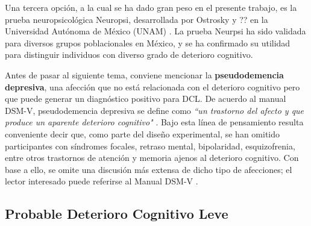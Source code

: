 Una tercera opción, a la cual se ha dado gran peso en el presente trabajo, es la prueba neuropsicológica Neuropsi, desarrollada por Ostrosky y ?? en la Universidad Autónoma de México (UNAM) \cite{Ostrosky1999}.
%
La prueba Neurpsi ha sido validada para diversos grupos poblacionales en México, y se ha confirmado su utilidad para distinguir individuos con diverso grado de deterioro cognitivo.


Antes de pasar al siguiente tema, conviene mencionar la \textbf{pseudodemencia depresiva}, una afección que no está relacionada con el deterioro cognitivo pero que puede generar un diagnóstico positivo para DCL.
%
De acuerdo al manual DSM-V, pseudodemencia depresiva se define como \textit{``un trastorno del afecto y que produce un aparente deterioro cognitivo"} \cite{DCM5}.
%
Bajo esta línea de pensamiento resulta conveniente decir que, como parte del diseño experimental, se han omitido participantes con síndromes focales, retraso mental, bipolaridad, esquizofrenia, entre otros trastornos de atención y memoria ajenos al deterioro cognitivo. 
%
Con base a ello, se omite una discusión más extensa de dicho tipo de afecciones; el lector interesado puede referirse al Manual DSM-V \cite{DCM5}.

%




\subsection{Probable Deterioro Cognitivo Leve}

